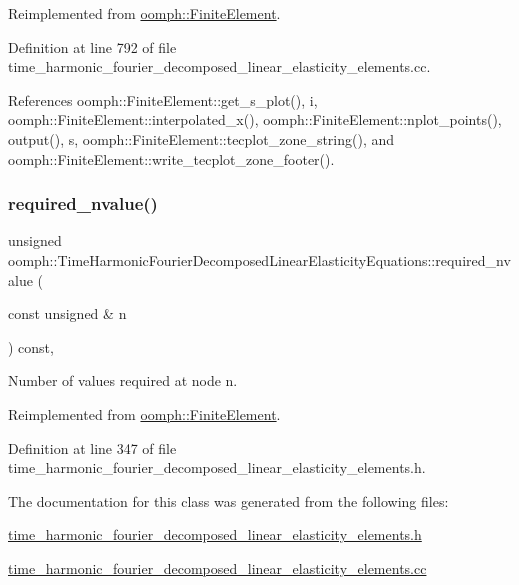 Reimplemented from \hyperlink{classoomph_1_1FiniteElement_a22b695c714f60ee6cd145be348042035}{oomph\+::\+Finite\+Element}.



Definition at line 792 of file time\+\_\+harmonic\+\_\+fourier\+\_\+decomposed\+\_\+linear\+\_\+elasticity\+\_\+elements.\+cc.



References oomph\+::\+Finite\+Element\+::get\+\_\+s\+\_\+plot(), i, oomph\+::\+Finite\+Element\+::interpolated\+\_\+x(), oomph\+::\+Finite\+Element\+::nplot\+\_\+points(), output(), s, oomph\+::\+Finite\+Element\+::tecplot\+\_\+zone\+\_\+string(), and oomph\+::\+Finite\+Element\+::write\+\_\+tecplot\+\_\+zone\+\_\+footer().

\mbox{\label{classoomph_1_1TimeHarmonicFourierDecomposedLinearElasticityEquations_a60b3470109b5dbfd868c1fad44b89d3e}} 
\subsubsection{\texorpdfstring{required\+\_\+nvalue()}{required\_nvalue()}}
{\footnotesize\ttfamily unsigned oomph\+::\+Time\+Harmonic\+Fourier\+Decomposed\+Linear\+Elasticity\+Equations\+::required\+\_\+nvalue (\begin{DoxyParamCaption}\item[{const unsigned \&}]{n }\end{DoxyParamCaption}) const\hspace{0.3cm}{\ttfamily [inline]}, {\ttfamily [virtual]}}



Number of values required at node n. 



Reimplemented from \hyperlink{classoomph_1_1FiniteElement_a56610c60d5bc2d7c27407a1455471b1a}{oomph\+::\+Finite\+Element}.



Definition at line 347 of file time\+\_\+harmonic\+\_\+fourier\+\_\+decomposed\+\_\+linear\+\_\+elasticity\+\_\+elements.\+h.



The documentation for this class was generated from the following files\+:\begin{DoxyCompactItemize}
\item 
\hyperlink{time__harmonic__fourier__decomposed__linear__elasticity__elements_8h}{time\+\_\+harmonic\+\_\+fourier\+\_\+decomposed\+\_\+linear\+\_\+elasticity\+\_\+elements.\+h}\item 
\hyperlink{time__harmonic__fourier__decomposed__linear__elasticity__elements_8cc}{time\+\_\+harmonic\+\_\+fourier\+\_\+decomposed\+\_\+linear\+\_\+elasticity\+\_\+elements.\+cc}\end{DoxyCompactItemize}
